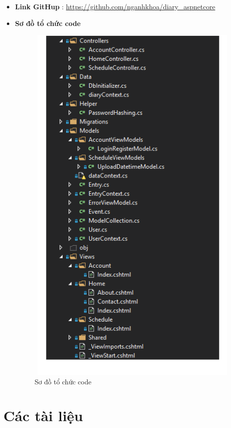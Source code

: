 \documentclass[a4paper]{article}
\begin{document}
	\begin{itemize}
		\item \textbf{Link GitHup} : \url{https://github.com/nganhkhoa/diary\_aspnetcore}




		\item \textbf{Sơ đồ tổ chức code}


		\begin{figure}[!h]
	 			\centering
      			\includegraphics[height=520pt,width=300pt]{Images/h14.png}
	 		 	\caption{Sơ đồ tổ chức code}
	 		 	\label{mainbook14}
	  		\end{figure}

	\end{itemize}


\section{Các tài liệu}
\end{document}
